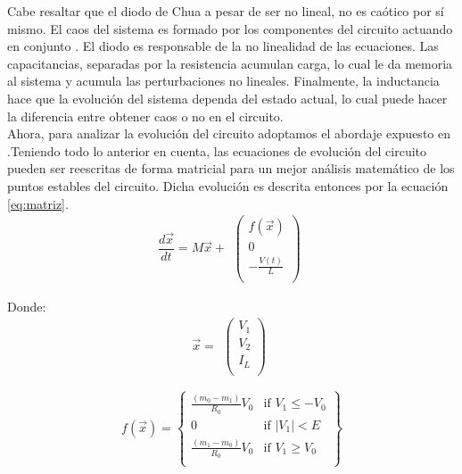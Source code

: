 \documentclass[%
 reprint,
 amsmath,amssymb,
 aps,
]{revtex4-1}
\begin{document}
Cabe resaltar que el diodo de Chua a pesar de ser no lineal, no es caótico por sí mismo. El caos del sistema es formado por los componentes del circuito actuando en conjunto \cite{chua}. El diodo es responsable de la no linealidad de las ecuaciones. Las capacitancias, separadas por la resistencia acumulan carga, lo cual le da memoria al sistema y acumula las perturbaciones no lineales. Finalmente, la inductancia hace que la evolución del sistema dependa del estado actual, lo cual puede hacer la diferencia entre obtener caos o no en el circuito.\\

Ahora, para analizar la evolución del circuito adoptamos el abordaje expuesto en \cite{Paper}.Teniendo todo lo anterior en cuenta, las ecuaciones de evolución del circuito pueden ser reescritas de forma matricial para un mejor análisis matemático de los puntos estables del circuito. Dicha evolución es descrita entonces por la ecuación \ref{eq:matriz}.\\

\begin{equation}
\frac{d\vec{x}}{dt}
= M\vec{x} + 
\begin{matrix}
	\begin{pmatrix}
	f(\vec{x})\\
	0\\
	-\frac{V(t)}{L}\\
	\end{pmatrix}
	\end{matrix}
\label{eq:matriz}
\end{equation}

Donde:\\

\begin{equation}
 \vec{x} = \begin{matrix}
	\begin{pmatrix}
	V_1\\
	V_2\\
	I_L\\
	\end{pmatrix}
	\end{matrix}
\end{equation}

\begin{equation}
 f(\vec{x}) = 
 \left\{
	\begin{array}{lll}
		\frac{(m_0 - m_1)}{R_0}V_0 & \mbox{if } V_1 \leq -V_0 \\
		0	& \mbox{if } |V_1| < E \\
	    \frac{(m_1 - m_0)}{R_0}V_0 & \mbox{if } V_1 \geq V_0 \\
	\end{array}
	\right\}
\end{equation}
\end{document}
